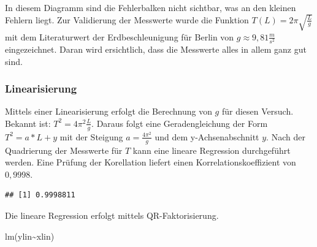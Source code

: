 \documentclass[
  9pt,
]{article}
\newenvironment{Shaded}{\begin{snugshade}}{\end{snugshade}}
\newcommand{\AttributeTok}[1]{\textcolor[rgb]{0.77,0.63,0.00}{#1}}
\newcommand{\CommentTok}[1]{\textcolor[rgb]{0.56,0.35,0.01}{\textit{#1}}}
\newcommand{\DecValTok}[1]{\textcolor[rgb]{0.00,0.00,0.81}{#1}}
\newcommand{\FunctionTok}[1]{\textcolor[rgb]{0.00,0.00,0.00}{#1}}
\newcommand{\NormalTok}[1]{#1}
\newcommand{\OtherTok}[1]{\textcolor[rgb]{0.56,0.35,0.01}{#1}}
\newcommand{\SpecialCharTok}[1]{\textcolor[rgb]{0.00,0.00,0.00}{#1}}
\newcommand{\StringTok}[1]{\textcolor[rgb]{0.31,0.60,0.02}{#1}}
\begin{document}
In diesem Diagramm sind die Fehlerbalken nicht sichtbar, was an den
kleinen Fehlern liegt. Zur Validierung der Messwerte wurde die Funktion
\(T(L)=2\pi\sqrt{\frac{L}{g}}\) mit dem Literaturwert der
Erdbeschleunigung für Berlin von \(g\approx 9,81\frac{m}{s^2}\)
eingezeichnet. Daran wird ersichtlich, dass die Messwerte alles in allem
ganz gut sind.

\hypertarget{linearisierung}{%
\subsubsection{Linearisierung}\label{linearisierung}}

Mittels einer Linearisierung erfolgt die Berechnung von \(g\) für diesen
Versuch. Bekannt ist: \(T^2 = 4\pi^2\frac{L}{g}\). Daraus folgt eine
Geradengleichung der Form \(T^2=a*L+y\) mit der Steigung
\(a=\frac{4\pi^2}{g}\) und dem y-Achsenabschnitt \(y\). Nach der
Quadrierung der Messwerte für \(T\) kann eine lineare Regression
durchgeführt werden. Eine Prüfung der Korellation liefert einen
Korrelationskoeffizient von \(0,9998\).

\begin{Shaded}
\end{Shaded}

\begin{verbatim}
## [1] 0.9998811
\end{verbatim}

Die lineare Regression erfolgt mittels QR-Faktorisierung.

\begin{Shaded}
\begin{Highlighting}[]
\FunctionTok{lm}\NormalTok{(ylin}\SpecialCharTok{\textasciitilde{}}\NormalTok{xlin)}
\end{Highlighting}
\end{Shaded}
\end{document}
